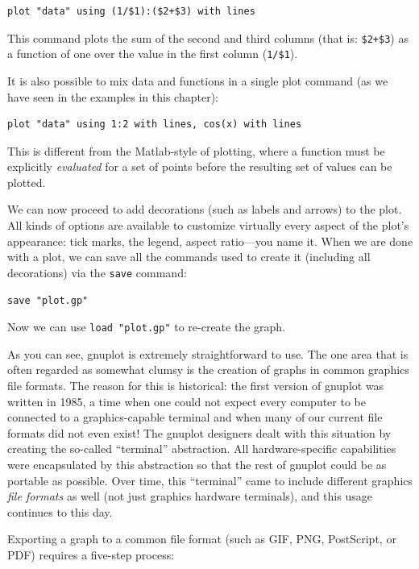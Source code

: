 \begin{verbatim}
plot "data" using (1/$1):($2+$3) with lines
\end{verbatim}

This command plots the sum of the second and third columns (that is:
\texttt{\$2+\$3}) as a function of one over the value in the first
column (\texttt{1/\$1}).

It is also possible to mix data and functions in a single plot command
(as we have seen in the examples in this chapter):

\begin{verbatim}
plot "data" using 1:2 with lines, cos(x) with lines
\end{verbatim}

This is different from the Matlab-style of plotting, where a function
must be explicitly \emph{evaluated} for a set of points before the
resulting set of values can be plotted.

We can now proceed to add decorations (such as labels and arrows) to
the plot. All kinds of options are available to customize virtually
every aspect of the plot's appearance: tick marks, the legend, aspect
ratio---you name it. When we are done with a plot, we can save all the
commands used to create it (including all decorations) via the
\texttt{save} command:

\begin{verbatim}
save "plot.gp"
\end{verbatim}

Now we can use \texttt{load "plot.gp"} to re-create the graph.

As you can see, gnuplot is extremely straightforward to use. The one
area that is often regarded as somewhat clumsy is the creation of
graphs in common graphics file formats. The reason for this is
historical: the first version of gnuplot was written in 1985, a time
when one could not expect every computer to be connected to a
graphics-capable terminal and when many of our current file formats
did not even exist!  The gnuplot designers dealt with this situation
by creating the so-called ``terminal'' abstraction. All
hardware-specific capabilities were encapsulated by this abstraction
so that the rest of gnuplot could be as portable as possible. Over
time, this ``terminal'' came to include different graphics \emph{file
  formats} as well (not just graphics hardware terminals), and this
usage continues to this day.

Exporting a graph to a common file format (such
as GIF, PNG, PostScript, or PDF) requires a five-step process:

